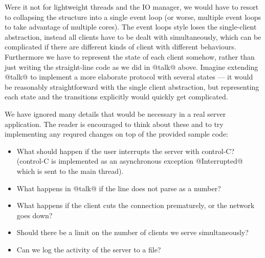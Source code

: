 Were it not for lightweight threads and the IO manager, we would have
to resort to collapsing the structure into a single event loop (or
worse, multiple event loops to take advantage of multiple cores).  The
event loops style loses the single-client abstraction, instead all
clients have to be dealt with simultaneously, which can be complicated
if there are different kinds of client with different behaviours.
Furthermore we have to represent the state of each client somehow,
rather than just writing the straight-line code as we did in @talk@
above.  Imagine extending @talk@ to implement a more elaborate
protocol with several states --- it would be reasonably
straightforward with the single client abstraction, but representing
each state and the transitions explicitly would quickly get
complicated.

We have ignored many details that would be necessary in a real server
application.  The reader is encouraged to think about these and to try
implementing any requred changes on top of the provided sample code:

\begin{itemize}
\item What should happen if the user interrupts the server with
  control-C? (control-C is implemented as an asynchronous exception
  @Interrupted@ which is sent to the main thread).
\item What happens in @talk@ if the line does not parse as a number?
\item What happens if the client cuts the connection prematurely, or
  the network goes down?
\item Should there be a limit on the number of clients we serve
  simultaneously?
\item Can we log the activity of the server to a file?
\end{itemize}


